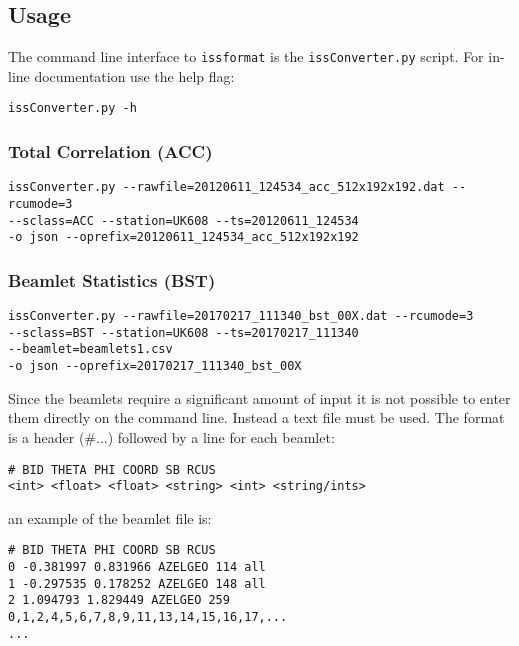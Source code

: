 \documentclass[10pt,a4paper]{article}
\begin{document}
\subsection{Usage}

The command line interface to \texttt{issformat} is the \texttt{issConverter.py}
script. For in-line documentation use the help flag:

\begin{verbatim}
issConverter.py -h
\end{verbatim}

\subsubsection{Total Correlation (ACC)}

\begin{verbatim}
issConverter.py --rawfile=20120611_124534_acc_512x192x192.dat --rcumode=3
--sclass=ACC --station=UK608 --ts=20120611_124534
-o json --oprefix=20120611_124534_acc_512x192x192
\end{verbatim}

\subsubsection{Beamlet Statistics (BST)}

\begin{verbatim}
issConverter.py --rawfile=20170217_111340_bst_00X.dat --rcumode=3
--sclass=BST --station=UK608 --ts=20170217_111340
--beamlet=beamlets1.csv
-o json --oprefix=20170217_111340_bst_00X
\end{verbatim}

Since the beamlets require a significant amount of input it is not possible to
enter them directly on the command line. Instead a text file must be used. The
format is a header (\#...) followed by a line for each beamlet:

\begin{verbatim}
# BID THETA PHI COORD SB RCUS
<int> <float> <float> <string> <int> <string/ints>
\end{verbatim}

\noindent an example of the beamlet file is:

\begin{verbatim}
# BID THETA PHI COORD SB RCUS
0 -0.381997 0.831966 AZELGEO 114 all
1 -0.297535 0.178252 AZELGEO 148 all
2 1.094793 1.829449 AZELGEO 259 0,1,2,4,5,6,7,8,9,11,13,14,15,16,17,...
...
\end{verbatim}
\end{document}
